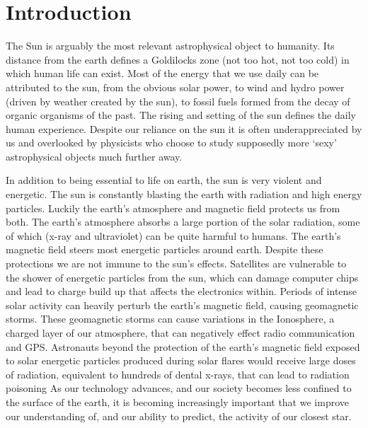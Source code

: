 \chapter{Introduction}\label{CH:introduction}


The Sun is arguably the most relevant astrophysical object to humanity.
Its distance from the earth defines a Goldilocks zone (not too hot, not too cold) in which human life can exist.
Most of the energy that we use daily can be attributed to the sun, from the obvious solar power, to wind and hydro power (driven by weather created by the sun), to fossil fuels formed from the decay of organic organisms of the past.
The rising and setting of the sun defines the daily human experience.
Despite our reliance on the sun it is often underappreciated by us and overlooked by physicists who choose to study supposedly more `sexy' astrophysical objects much further away.

In addition to being essential to life on earth, the sun is very violent and energetic.
The sun is constantly blasting the earth with radiation and high energy particles.
Luckily the earth's atmosphere and magnetic field protects us from both.
The earth's atmosphere absorbs a large portion of the solar radiation, some of which (x-ray and ultraviolet) can be quite harmful to humans.
The earth's magnetic field steers most energetic particles around earth.
Despite these protections we are not immune to the sun's effects.
Satellites are vulnerable to the shower of energetic particles from the sun, which can damage computer chips and lead to charge build up that affects the electronics within.
Periods of intense solar activity can heavily perturb the earth's magnetic field, causing geomagnetic storms.
These geomagnetic storms can cause variations in the Ionosphere, a charged layer of our atmosphere, that can negatively effect radio communication and GPS.
Astronauts beyond the protection of the earth's magnetic field exposed to solar energetic particles produced during solar flares would receive large doses of radiation, equivalent to hundreds of dental x-rays, that can lead to radiation poisoning \citep[][and references therein]{Temmer2021}
As our technology advances, and our society becomes less confined to the surface of the earth, it is becoming increasingly important that we improve our understanding of, and our ability to predict, the activity of our closest star.

